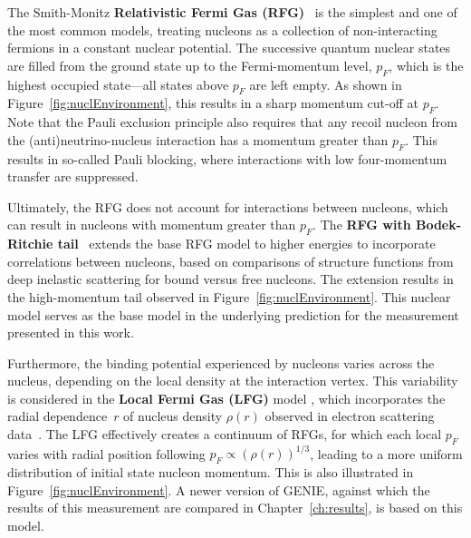The Smith-Monitz \textbf{Relativistic Fermi Gas (RFG)}~\cite{RFG_SMITH1972605, 1975547} is the simplest and one of the most common models, treating nucleons as a collection of non-interacting fermions in a constant nuclear potential. The successive quantum nuclear states are filled from the ground state up to the Fermi-momentum level, $p_F$, which is the highest occupied state---all states above $p_F$ are left empty. As shown in Figure~\ref{fig:nuclEnvironment}, this results in a sharp momentum cut-off at $p_F$. Note that the Pauli exclusion principle also requires that any recoil nucleon from the (anti)neu\-trino-nucleus interaction has a momentum greater than $p_F$. This results in so-called Pauli blocking\enlargethispage{1\baselineskip}, where interactions with low four-momentum transfer are suppressed. %

Ultimately, the RFG does not account for interactions between nucleons, which can result in nucleons with momentum greater than $p_F$. The \textbf{RFG with Bodek-Ritchie tail}~\cite{BodekRitchie1981_PhysRevD.24.1400} extends the base RFG model to higher energies to incorporate correlations between nucleons, based on comparisons of structure functions from deep inelastic scattering for bound versus free nucleons. The extension results in the high-momentum tail observed in Figure~\ref{fig:nuclEnvironment}. This nuclear model serves as the base model in the underlying prediction for the measurement presented in this work.

Furthermore, the binding potential experienced by nucleons varies across the nucleus, depending on the local density at the interaction vertex. This variability is considered in the \textbf{Local Fermi Gas (LFG)} model \cite{RPANieves2004_PhysRevC.70.055503, PhysRevC.79.034601}, which incorporates the radial dependence~$r$ of nucleus density $\rho(r)$ observed in electron scattering data~\cite{DEVRIES1987495}. The LFG effectively creates a continuum of RFGs, for which each local $p_F$ varies with radial position following $p_F \propto (\rho(r))^{1/3}$, leading to a more uniform distribution of initial state nucleon momentum. This is also illustrated in Figure~\ref{fig:nuclEnvironment}. A newer version of GENIE, against which the results of this measurement are compared in Chapter~\ref{ch:results}, is based on this model.

